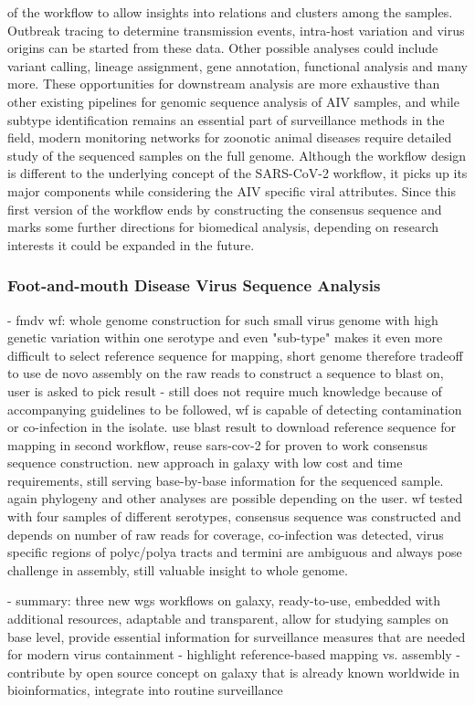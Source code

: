 of the workflow to allow insights into relations and clusters among the samples. Outbreak tracing to determine transmission events, intra-host variation and virus origins can be started from these data. Other possible analyses could include variant calling, lineage assignment, gene annotation, functional analysis and many more. These opportunities for downstream analysis are more exhaustive than other existing pipelines for genomic sequence analysis of \ac{AIV} samples, and while subtype identification remains an essential part of surveillance methods in the field, modern monitoring networks for zoonotic animal diseases require detailed study of the sequenced samples on the full genome. Although the workflow design is different to the underlying concept of the \ac{SARS-CoV-2} workflow, it picks up its major components while considering the \ac{AIV} specific viral attributes. 
Since this first version of the workflow ends by constructing the consensus sequence and marks some further directions for biomedical analysis, depending on research interests it could be expanded in the future.

\subsubsection*{Foot-and-mouth Disease Virus Sequence Analysis}
- fmdv wf: whole genome construction for such small virus genome with high genetic variation within one serotype and even "sub-type" makes it even more difficult to select reference sequence for mapping, short genome therefore tradeoff to use de novo assembly on the raw reads to construct a sequence to blast on, user is asked to pick result - still does not require much knowledge because of accompanying guidelines to be followed, wf is capable of detecting contamination or co-infection in the isolate. use blast result to download reference sequence for mapping in second workflow, reuse sars-cov-2 for proven to work consensus sequence construction. new approach in galaxy with low cost and time requirements, still serving base-by-base information for the sequenced sample. again phylogeny and other analyses are possible depending on the user. wf tested with four samples of different serotypes, consensus sequence was constructed and depends on number of raw reads for coverage, co-infection was detected, virus specific regions of polyc/polya tracts and termini are ambiguous and always pose challenge in assembly, still valuable insight to whole genome.

- summary: three new wgs workflows on galaxy, ready-to-use, embedded with additional resources, adaptable and transparent, allow for studying samples on base level, provide essential information for surveillance measures that are needed for modern virus containment
- highlight reference-based mapping vs. assembly
- contribute by open source concept on galaxy that is already known worldwide in bioinformatics, integrate into routine surveillance

